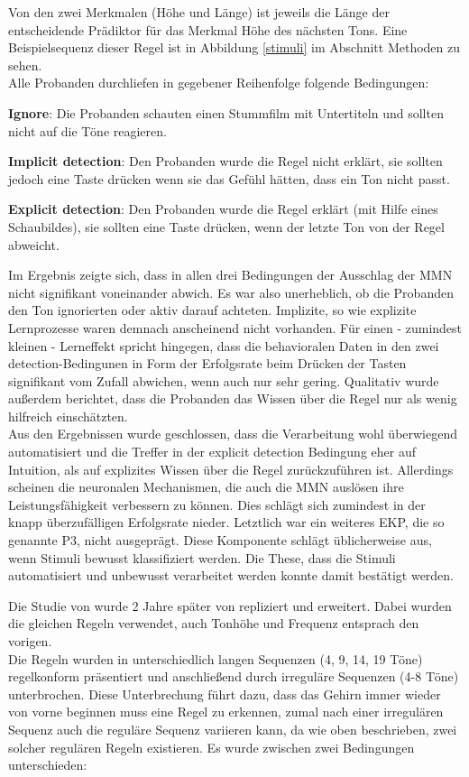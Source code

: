 \documentclass[doc,a4paper,12pt]{apa6}
\begin{document}
Von den zwei Merkmalen (Höhe und Länge) ist jeweils die Länge der entscheidende Prädiktor für das Merkmal Höhe des nächsten Tons. Eine Beispielsequenz dieser Regel ist in Abbildung \ref{stimuli} im Abschnitt Methoden zu sehen.\\
Alle Probanden durchliefen in gegebener Reihenfolge folgende Bedingungen:

\begin{compactitem}
  \item \textbf{Ignore}: Die Probanden schauten einen Stummfilm mit Untertiteln und sollten nicht auf die Töne reagieren.
  \item \textbf{Implicit detection}: Den Probanden wurde die Regel nicht erklärt, sie sollten jedoch eine Taste drücken wenn sie das Gefühl hätten, dass ein Ton nicht passt.
  \item \textbf{Explicit detection}: Den Probanden wurde die Regel erklärt (mit Hilfe eines Schaubildes), sie sollten eine Taste drücken, wenn der letzte Ton von der Regel abweicht.
\end{compactitem}

Im Ergebnis zeigte sich, dass in allen drei Bedingungen der Ausschlag der MMN nicht signifikant voneinander abwich. Es war also unerheblich, ob die Probanden den Ton ignorierten oder aktiv darauf achteten. Implizite, so wie explizite Lernprozesse waren demnach anscheinend nicht vorhanden. Für einen - zumindest kleinen - Lerneffekt spricht hingegen, dass die behavioralen Daten in den zwei detection-Bedingunen in Form der Erfolgsrate beim Drücken der Tasten signifikant vom Zufall abwichen, wenn auch nur sehr gering. Qualitativ wurde außerdem berichtet, dass die Probanden das Wissen über die Regel nur als wenig hilfreich einschätzten.\\
Aus den Ergebnissen wurde geschlossen, dass die Verarbeitung wohl überwiegend automatisiert und die Treffer in der explicit detection Bedingung eher auf Intuition, als auf explizites Wissen über die Regel zurückzuführen ist. Allerdings scheinen die neuronalen Mechanismen, die auch die MMN auslösen ihre Leistungsfähigkeit verbessern zu können. Dies schlägt sich zumindest in der knapp überzufälligen Erfolgsrate nieder. Letztlich war ein weiteres EKP, die so genannte P3, nicht ausgeprägt. Diese Komponente schlägt üblicherweise aus, wenn Stimuli bewusst klassifiziert werden. Die These, dass die Stimuli automatisiert und unbewusst verarbeitet werden konnte damit bestätigt werden.

Die Studie von \textcite{paavilainen2007preattentive} wurde 2 Jahre später von \textcite{bendixen2008rapid} repliziert und erweitert. Dabei wurden die gleichen Regeln verwendet, auch Tonhöhe und Frequenz entsprach den vorigen.\\
Die Regeln wurden in unterschiedlich langen Sequenzen (4, 9, 14, 19 Töne) regelkonform präsentiert und anschließend durch irreguläre Sequenzen (4-8 Töne) unterbrochen. Diese Unterbrechung führt dazu, dass das Gehirn immer wieder von vorne beginnen muss eine Regel zu erkennen, zumal nach einer irregulären Sequenz auch die reguläre Sequenz variieren kann, da wie oben beschrieben, zwei solcher regulären Regeln existieren. Es wurde zwischen zwei Bedingungen unterschieden:
\end{document}
